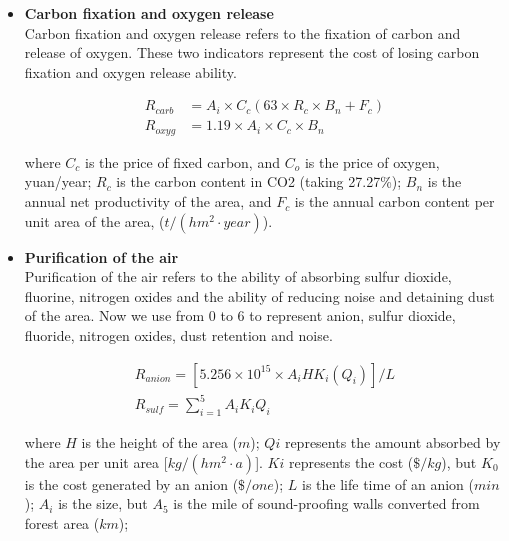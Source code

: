\documentclass{mcmthesis}
\begin{document}
				
				\begin{itemize}
					
					\item \textbf{Carbon fixation and oxygen release} \\
					Carbon fixation and oxygen release refers to the fixation of carbon and release of oxygen. These two indicators represent the cost of losing carbon fixation and oxygen release ability.
					
					\begin{equation}
						\begin{aligned} 
						R _ { carb } & = A _ { i } \times C _ { c } \left( 63 \times R _ { c } \times B _ { n } + F _ { c } \right) \\ 
						R _ { oxyg } & = 1.19 \times A _ { i } \times C _ { c } \times B _ { n } \end{aligned}
					\end{equation}
					
					where $C_c$ is the price of fixed carbon, and $C_o$ is the price of oxygen, yuan/year; $R_c$ is the carbon content in CO2 (taking 27.27\%); $B_n$ is the annual net productivity of the area, and $F_c$ is the annual carbon content per unit area of the area, ($t/(hm^2 ·year)$).
					
					\item \textbf{Purification of the air} \\
					Purification of the air refers to the ability of absorbing sulfur dioxide, fluorine, nitrogen oxides and the ability of reducing noise and detaining dust of the area. Now we use from 0 to 6 to represent anion, sulfur dioxide, fluoride, nitrogen oxides, dust retention and noise.
					
					
					
					\begin{equation}
					\begin{array} { l } 
					{R _ { anion } = [ 5.256 \times 10 ^ { 15 } \times A _ { i } H K _ { i } \left( Q _ { i } \right) ] / L  }\\ 
					{ R _ { sulf } = \sum _ { i = 1 } ^ { 5 } A _ { i } K _ { i } Q _ { i }} 
					\end{array}
					\end{equation}
					
					where $H$ is the height of the area ($m$); $Qi$ represents the amount absorbed by the area per unit area [$kg/(hm^2·a)$]. $Ki$ represents the cost ($\$/kg$), but $K_0$ is the cost generated by an anion ($\$/one$); $L$ is the life time of an anion ($min$); $A_i$ is the size, but $A_5$ is the mile of sound-proofing walls converted from forest area ($km$);
					
	
				\end{itemize}
				
\end{document}
